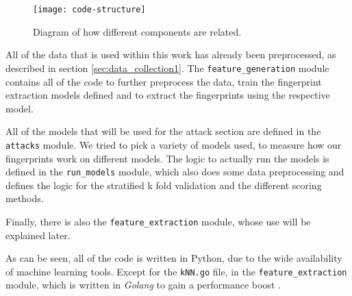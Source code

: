 \begin{figure}[ht]
  \centering
  \texttt{[image: code-structure]}
  \caption{Diagram of how different components are related.}
  \label{fig:code-structure}
\end{figure}

All of the data that is used within this work has already been preprocessed, as described in section \ref{sec:data_collection1}.
The \texttt{feature\_generation} module contains all of the code to further preprocess the data, train the fingerprint extraction models defined and to extract the fingerprints using the respective model.

All of the models that will be used for the attack section are defined in the \texttt{attacks} module.
We tried to pick a variety of models used, to measure how our fingerprints work on different models.
The logic to actually run the models is defined in the \texttt{run\_models} module, which also does some data preprocessing and defines the logic for the stratified k fold validation and the different scoring methods.

Finally, there is also the \texttt{feature\_extraction} module, whose use will be explained later.

As can be seen, all of the code is written in Python, due to the wide availability of machine learning tools.
Except for the \texttt{kNN.go} file, in the \texttt{feature\_extraction} module, which is written in \textit{Golang} to gain a performance boost \cite{gokNN}.
